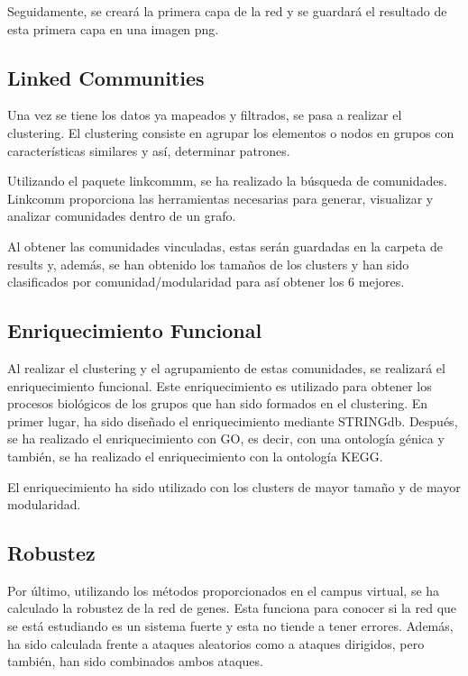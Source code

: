 Seguidamente, se creará la primera capa de la red y se guardará el resultado de esta primera capa en una imagen png. 

\subsection{Linked Communities}
Una vez se tiene los datos ya mapeados y filtrados, se pasa a realizar el clustering. El clustering consiste en agrupar los elementos o nodos en grupos con características similares y así, determinar patrones.

Utilizando el paquete linkcommm, se ha realizado la búsqueda de comunidades. Linkcomm proporciona las herramientas necesarias para generar, visualizar y analizar comunidades dentro de un grafo.

Al obtener las comunidades vinculadas, estas serán guardadas en la carpeta de results y, además, se han obtenido los tamaños de los clusters y han sido clasificados por comunidad/modularidad para así obtener los 6 mejores.

\subsection{Enriquecimiento Funcional}
Al realizar el clustering y el agrupamiento de estas comunidades, se realizará el enriquecimiento funcional. Este enriquecimiento es utilizado para obtener los procesos biológicos de los grupos que han sido formados en el clustering.
En primer lugar, ha sido diseñado el enriquecimiento mediante STRINGdb. Después, se ha realizado el enriquecimiento con GO, es decir, con una ontología génica y también, se ha realizado el enriquecimiento con la ontología KEGG. 

El enriquecimiento ha sido utilizado con los clusters de mayor tamaño y de mayor modularidad.

\subsection{Robustez}
Por último, utilizando los métodos proporcionados en el campus virtual, se ha calculado la robustez de la red de genes. Esta funciona para conocer si la red que se está estudiando es un sistema fuerte y esta no tiende a tener errores. Además, ha sido calculada frente a ataques aleatorios como a ataques dirigidos, pero también, han sido combinados ambos ataques.

 